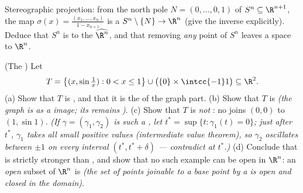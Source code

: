 \begin{exercise}[$\star\star\star$]\label{exo:b3:topology:11}
Stereographic projection: from the north pole $N = (0, \dots,
0, 1)$ of $S^n \subseteq \R^{n+1}$, the map $\sigma(x) =
\frac{(x_1, \dots, x_n)}{1 - x_{n+1}}$ is a  $S^n
\setminus \{N\} \to \R^n$ (give the inverse explicitly). Deduce
that $S^n$ is  to the 
$\widehat{\R^n}$, and that removing \emph{any} point of $S^n$
leaves a space  to $\R^n$.
\end{exercise}

\begin{exercise}[$\star\star\star$]\label{exo:b3:topology:12}
(The ) Let
\[
T = \bigl\{(x, \sin\tfrac1x) : 0 < x \leq 1\bigr\}
\cup \bigl(\{0\}\times\intcc{-1}1\bigr) \subseteq \R^2 .
\]
(a) Show that $T$ is , and that it is the  of
the graph part.
(b) Show that $T$ is  \emph{(the graph is 
as a  image; its  remains )}.
(c) Show that $T$ is \emph{not} : no 
 joins $(0,0)$ to $(1, \sin1)$. \emph{(If $\gamma =
(\gamma_1, \gamma_2)$ is such a , let $t^* = \sup\{t :
\gamma_1(t) = 0\}$; just after $t^*$, $\gamma_1$ takes all
small positive values (intermediate value theorem), so
$\gamma_2$ oscillates between $\pm1$ on every interval
$(t^*, t^* + \delta)$ --- contradict  at $t^*$.)}
(d) Conclude that  is strictly stronger
than , and show that no such example can be
open in $\R^n$: an \emph{open}  subset of $\R^n$ is
 \emph{(the set of points joinable to a base
point by a  is open and closed in the domain)}.
\end{exercise}

